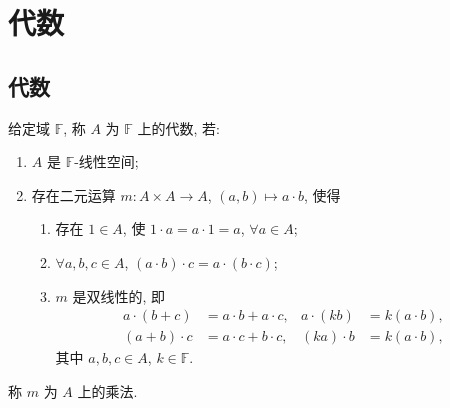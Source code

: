 
\section{代数}

\subsection{代数}

\begin{definition}[$\mathbb{F}$-代数]\label{def:k-algebra}
给定域 $\mathbb{F}$, 称 $A$ 为 $\mathbb{F}$ 上的代数, 若:
\begin{enumerate}
  \item $A$ 是 $\mathbb{F}$-线性空间;
  \item 存在二元运算 $m\colon A\times A\to A$, $(a,b)\mapsto a\cdot b$, 使得
  \begin{enumerate}
    \item 存在 $1\in A$, 使 $1\cdot a=a\cdot 1=a$, $\forall a\in A$;
    \item $\forall a,b,c\in A$, $(a\cdot b)\cdot c=a\cdot(b\cdot c)$;
    \item $m$ 是双线性的, 即
    \begin{align*}
      a\cdot(b+c)&=a\cdot b+a\cdot c, & a\cdot(kb)&=k(a\cdot b),\\
      (a+b)\cdot c&=a\cdot c+b\cdot c, & (ka)\cdot b&=k(a\cdot b),
    \end{align*}
    其中 $a,b,c\in A$, $k\in \mathbb{F}$.
  \end{enumerate}
\end{enumerate}
称 $m$ 为 $A$ 上的乘法.
\end{definition}

